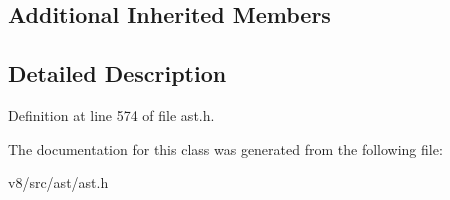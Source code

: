 \subsection*{Additional Inherited Members}


\subsection{Detailed Description}


Definition at line 574 of file ast.\+h.



The documentation for this class was generated from the following file\+:\begin{DoxyCompactItemize}
\item 
v8/src/ast/ast.\+h\end{DoxyCompactItemize}
